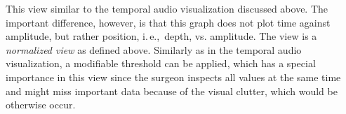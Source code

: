 \documentclass[review]{vgtc}                 %
\begin{document}
This view similar to the temporal audio visualization discussed above. The important difference, however, is that this graph does not plot time against amplitude, but rather position, i.\,e.,~depth, vs. amplitude. The view is a \emph{normalized view} as defined above. Similarly as in the temporal audio visualization, a modifiable threshold can be applied, which has a special importance in this view since the surgeon inspects all values at the same time and might miss important data because of the visual clutter, which would be otherwise occur.

%

\end{document}
